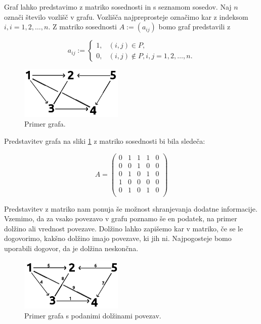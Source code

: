 \documentclass[a4paper,oneside]{article}
\begin{document}
Graf lahko predstavimo z matriko sosednosti in s seznamom sosedov.
Naj $n$ označi število vozlišč v grafu. Vozlišča najpreprosteje označimo kar z indeksom $i,
i = 1, 2, \ldots, n$. Z matriko sosednosti $A := (a_{ij})$ bomo graf predstavili z 

\[ a_{ij} := 
\left\{
\begin{array}{ll}
  1,& (i, j) \in P, \\
  0,& (i, j) \notin P, i, j = 1, 2, \ldots, n. 
\end{array}
\right. %
\]
 
\begin{figure}[h]
    \begin{center}
        \includegraphics[height=25mm]{slike/graf1.png}
    \end{center}
    \caption{Primer grafa.}
    \label{fig:graf1}
\end{figure}

Predstavitev grafa na sliki \ref{fig:graf1} z matriko sosednosti bi bila sledeča:

\[
A = \left(
\begin{array}{ccccc}
  0 & 1 & 1 & 1 & 0 \\
  0 & 0 & 1 & 0 & 0 \\
  0 & 1 & 0 & 1 & 0 \\
  1 & 0 & 0 & 0 & 0 \\
  0 & 1 & 0 & 1 & 0 \\
\end{array}
\right)
\]

Predstavitev z matriko nam ponuja še možnost shranjevanja dodatne informacije. Vzemimo, da
za vsako povezavo v grafu poznamo še en podatek, na primer dolžino ali vrednost povezave.
Dolžino lahko zapišemo kar v matriko, če se le dogovorimo, kakšno dolžino imajo povezave,
ki jih ni. Najpogosteje bomo uporabili dogovor, da je dolžina neskončna.
\pagebreak
\begin{figure}[h]
    \begin{center}
        \includegraphics[height=25mm]{slike/graf2.png}
    \end{center}
    \caption{Primer grafa s podanimi dolžinami povezav.}
    \label{fig:graf2}
\end{figure}
\end{document}
